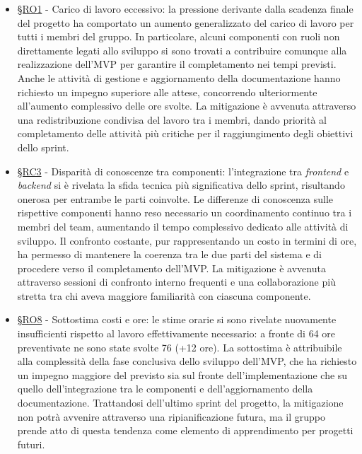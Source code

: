 \documentclass[10pt, letterpaper]{article}
\newcommand{\rif}[1]{\hyperref[#1]{§#1}}
\begin{document}
    \begin{itemize}
    \item \rif{RO1} - Carico di lavoro eccessivo: la pressione derivante dalla scadenza finale del progetto ha comportato un aumento generalizzato del carico di lavoro per tutti i membri del gruppo. In particolare, alcuni componenti con ruoli non direttamente legati allo sviluppo si sono trovati a contribuire comunque alla realizzazione dell'MVP per garantire il completamento nei tempi previsti. Anche le attività di gestione e aggiornamento della documentazione hanno richiesto un impegno superiore alle attese, concorrendo ulteriormente all'aumento complessivo delle ore svolte. La mitigazione è avvenuta attraverso una redistribuzione condivisa del lavoro tra i membri, dando priorità al completamento delle attività più critiche per il raggiungimento degli obiettivi dello sprint.

    \item \rif{RC3} - Disparità di conoscenze tra componenti: l'integrazione tra \textit{frontend} e \textit{backend} si è rivelata la sfida tecnica più significativa dello sprint, risultando onerosa per entrambe le parti coinvolte. Le differenze di conoscenza sulle rispettive componenti hanno reso necessario un coordinamento continuo tra i membri del team, aumentando il tempo complessivo dedicato alle attività di sviluppo. Il confronto costante, pur rappresentando un costo in termini di ore, ha permesso di mantenere la coerenza tra le due parti del sistema e di procedere verso il completamento dell'MVP. La mitigazione è avvenuta attraverso sessioni di confronto interno frequenti e una collaborazione più stretta tra chi aveva maggiore familiarità con ciascuna componente.

    \item \rif{RO8} - Sottostima costi e ore: le stime orarie si sono rivelate nuovamente insufficienti rispetto al lavoro effettivamente necessario: a fronte di 64 ore preventivate ne sono state svolte 76 (+12 ore). La sottostima è attribuibile alla complessità della fase conclusiva dello sviluppo dell'MVP, che ha richiesto un impegno maggiore del previsto sia sul fronte dell'implementazione che su quello dell'integrazione tra le componenti e dell'aggiornamento della documentazione. Trattandosi dell'ultimo sprint del progetto, la mitigazione non potrà avvenire attraverso una ripianificazione futura, ma il gruppo prende atto di questa tendenza come elemento di apprendimento per progetti futuri.
\end{itemize}
\end{document}

